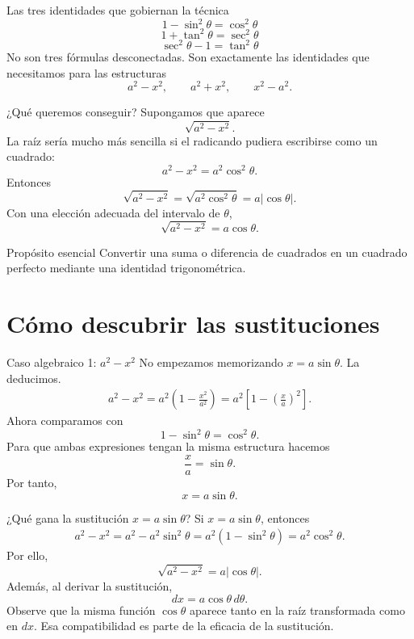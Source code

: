 \documentclass[10pt,aspectratio=169]{beamer}
\begin{document}
\begin{frame}{Las tres identidades que gobiernan la técnica}
\[
\boxed{1-\sin^2\theta=\cos^2\theta}
\]
\[
\boxed{1+\tan^2\theta=\sec^2\theta}
\]
\[
\boxed{\sec^2\theta-1=\tan^2\theta}
\]
No son tres fórmulas desconectadas. Son exactamente las identidades que necesitamos para las estructuras
\[
a^2-x^2,\qquad a^2+x^2,\qquad x^2-a^2.
\]
\end{frame}

\begin{frame}{¿Qué queremos conseguir?}
Supongamos que aparece
\[
\sqrt{a^2-x^2}.
\]
La raíz sería mucho más sencilla si el radicando pudiera escribirse como un cuadrado:
\[
a^2-x^2=a^2\cos^2\theta.
\]
Entonces
\[
\sqrt{a^2-x^2}=\sqrt{a^2\cos^2\theta}=a|\cos\theta|.
\]
Con una elección adecuada del intervalo de $\theta$,
\[
\sqrt{a^2-x^2}=a\cos\theta.
\]
\begin{block}{Propósito esencial}
Convertir una suma o diferencia de cuadrados en un cuadrado perfecto mediante una identidad trigonométrica.
\end{block}
\end{frame}

\section{Cómo descubrir las sustituciones}
\begin{frame}{Caso algebraico 1: $a^2-x^2$}
No empezamos memorizando $x=a\sin\theta$. La deducimos.
\begin{align*}
a^2-x^2=a^2\left(1-\frac{x^2}{a^2}\right)=a^2\left[1-\left(\frac{x}{a}\right)^2\right].
\end{align*}
Ahora comparamos con
\[
1-\sin^2\theta=\cos^2\theta.
\]
Para que ambas expresiones tengan la misma estructura hacemos
\[
\frac{x}{a}=\sin\theta.
\]
Por tanto,
\[
\boxed{x=a\sin\theta}.
\]
\end{frame}

\begin{frame}{¿Qué gana la sustitución $x=a\sin\theta$?}
Si $x=a\sin\theta$, entonces
\begin{align*}
a^2-x^2=a^2-a^2\sin^2\theta=a^2(1-\sin^2\theta)=a^2\cos^2\theta.
\end{align*}
Por ello,
\[
\sqrt{a^2-x^2}=a|\cos\theta|.
\]
Además, al derivar la sustitución,
\[
\boxed{dx=a\cos\theta\,d\theta}.
\]
Observe que la misma función $\cos\theta$ aparece tanto en la raíz transformada como en $dx$. Esa compatibilidad es parte de la eficacia de la sustitución.
\end{frame}
\end{document}
